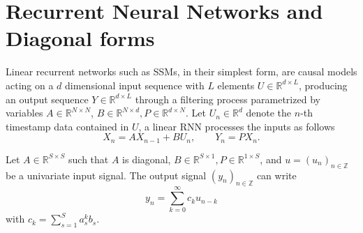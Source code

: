 
\section{Recurrent Neural Networks and Diagonal forms}

\label{RNN basics}

 

Linear recurrent networks such as SSMs, in their simplest form, are causal models acting on a $d$ dimensional input sequence with $L$ elements $U\in\mathbb{R}^{d\times L}$, producing an output sequence $Y\in\mathbb{R}^{d\times L}$ through a filtering process parametrized by variables $A\in\mathbb{R}^{N\times N}$, $B\in\mathbb{R}^{N\times d}, P\in\mathbb{R}^{d\times N}$. Let $U_n\in\mathbb{R}^{d}$ denote the $n$-th timestamp data contained in $U$, a linear RNN processes the inputs as follows~\citep{gu2022parameterization,orvieto2023resurrecting}
\begin{equation}
    X_{n} = A X_{n-1} + B U_n,\qquad Y_{n} = PX_n.
    \label{eq:appendix linear_RNN}
\end{equation}

\begin{proposition}
    Let $A\in\mathbb{R}^{S\times S}$ such that $A$ is diagonal, $B\in\mathbb{R}^{S\times 1}, P\in\mathbb{R}^{1\times S}$, and $u = (u_n)_{n\in\mathbb{Z}}$ be a univariate input signal. The output signal $(y_n)_{n\in\mathbb{Z}}$ can write 
    \[
    y_n = \sum_{k=0}^\infty c_ku_{n-k}
    \]
    with $c_k = \sum_{s=1}^Sa_s^kb_s$.
\end{proposition}

